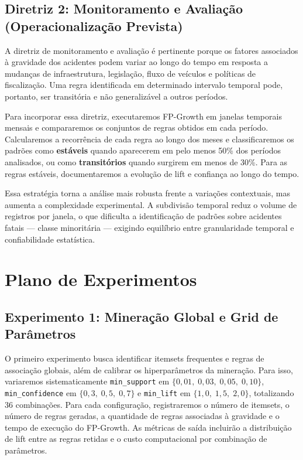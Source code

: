 \documentclass[12pt]{article}
\begin{document}
\subsection{Diretriz 2: Monitoramento e Avaliação (Operacionalização Prevista)}

A diretriz de monitoramento e avaliação é pertinente porque os fatores associados à gravidade dos acidentes podem variar ao longo do tempo em resposta a mudanças de infraestrutura, legislação, fluxo de veículos e políticas de fiscalização. Uma regra identificada em determinado intervalo temporal pode, portanto, ser transitória e não generalizável a outros períodos.

Para incorporar essa diretriz, executaremos FP-Growth em janelas temporais mensais e compararemos os conjuntos de regras obtidos em cada período. Calcularemos a recorrência de cada regra ao longo dos meses e classificaremos os padrões como \textbf{estáveis} quando aparecerem em pelo menos 50\% dos períodos analisados, ou como \textbf{transitórios} quando surgirem em menos de 30\%. Para as regras estáveis, documentaremos a evolução de lift e confiança ao longo do tempo.

Essa estratégia torna a análise mais robusta frente a variações contextuais, mas aumenta a complexidade experimental. A subdivisão temporal reduz o volume de registros por janela, o que dificulta a identificação de padrões sobre acidentes fatais --- classe minoritária --- exigindo equilíbrio entre granularidade temporal e confiabilidade estatística.

\section{Plano de Experimentos}

\subsection{Experimento 1: Mineração Global e Grid de Parâmetros}

O primeiro experimento busca identificar itemsets frequentes e regras de associação globais, além de calibrar os hiperparâmetros da mineração. Para isso, variaremos sistematicamente \texttt{min\_support} em $\{0{,}01,\; 0{,}03,\; 0{,}05,\; 0{,}10\}$, \texttt{min\_confidence} em $\{0{,}3,\; 0{,}5,\; 0{,}7\}$ e \texttt{min\_lift} em $\{1{,}0,\; 1{,}5,\; 2{,}0\}$, totalizando 36 combinações. Para cada configuração, registraremos o número de itemsets, o número de regras geradas, a quantidade de regras associadas à gravidade e o tempo de execução do FP-Growth. As métricas de saída incluirão a distribuição de lift entre as regras retidas e o custo computacional por combinação de parâmetros.
\end{document}
